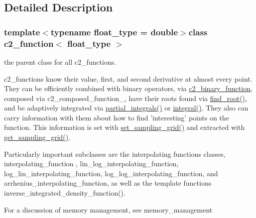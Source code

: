 \subsection{Detailed Description}
\subsubsection*{template$<$typename float\-\_\-type = double$>$class c2\-\_\-function$<$ float\-\_\-type $>$}

the parent class for all c2\-\_\-functions.

c2\-\_\-functions know their value, first, and second derivative at almost every point. They can be efficiently combined with binary operators, via \hyperlink{classc2__binary__function}{c2\-\_\-binary\-\_\-function}, composed via c2\-\_\-composed\-\_\-function\-\_\-, have their roots found via \hyperlink{classc2__function_acd17a7191226578c866d82cb2e9ff89f}{find\-\_\-root()}, and be adaptively integrated via \hyperlink{classc2__function_a89ce5e2f44ebfaf9eb4d66605cde4fde}{partial\-\_\-integrals()} or \hyperlink{classc2__function_a675c5056562332be2e49b38485d322b7}{integral()}. They also can carry information with them about how to find 'interesting' points on the function. This information is set with \hyperlink{classc2__function_a23828c75121b442899ab7a80cf5abbb0}{set\-\_\-sampling\-\_\-grid()} and extracted with \hyperlink{classc2__function_ad03264dcc015e5d0b1b6eb30df3f32be}{get\-\_\-sampling\-\_\-grid()}. 

Particularly important subclasses are the interpolating functions classes, interpolating\-\_\-function , lin\-\_\-log\-\_\-interpolating\-\_\-function, log\-\_\-lin\-\_\-interpolating\-\_\-function, log\-\_\-log\-\_\-interpolating\-\_\-function, and arrhenius\-\_\-interpolating\-\_\-function, as well as the template functions inverse\-\_\-integrated\-\_\-density\-\_\-function().

For a discussion of memory management, see memory\-\_\-management 

